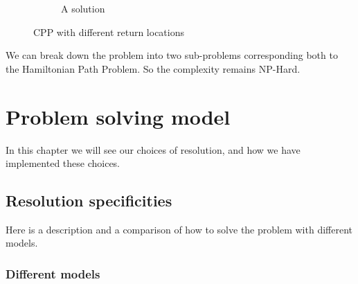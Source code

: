 \documentclass[12pt, a4paper,twoside]{memoir}
\begin{document}
\begin{figure}[H]
\begin{subfigure}{.5\textwidth}
			\caption{A solution}
		\end{subfigure}
		\caption{CPP with different return locations}
		\label{fig:CPP with different return locations}
	\end{figure}
	
	We can break down the problem into two sub-problems corresponding both to the Hamiltonian Path Problem. So the complexity remains NP-Hard.
	
	\cleardoublepage
	\chapter{Problem solving model}
	
	In this chapter we will see our choices of resolution, and how we have implemented these choices. 
	
	\section{Resolution specificities}
	
	Here is a description and a comparison of how to solve the problem with different models. 
	
	\subsection{Different models}
	
\end{document}
